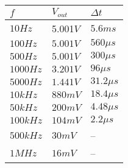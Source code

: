 \begin{tabular}{| m{5em} | m{5 em} |m{5em}|}
    \hline
    $f$ & $V_{out}$ & $\Delta t$\\
    \hline
    $10 Hz$ & 5.001$V$ & $5.6 ms$\\
    $100 Hz$ & $5.001 V$ & $560 \mu s$\\
    $500 Hz$ & $5.001 V$ & $300 \mu s$\\
    $1000 Hz$ & $3.201 V$ & $96 \mu s$\\
    $5000 Hz$ & $1.441 V$ & $31.2 \mu s$\\
    $10k Hz$ & $880 mV$ & $18.4 \mu s$\\
    $50k Hz$ & $200 mV$ & $4.48 \mu s$\\
    $100kHz$ & $104 mV$ & $2.2 \mu s$\\
    $500kHz$ & $30 mV$ & --\\
    $1MHz$ & $16mV$ & --\\
    \hline
    
\end{tabular}